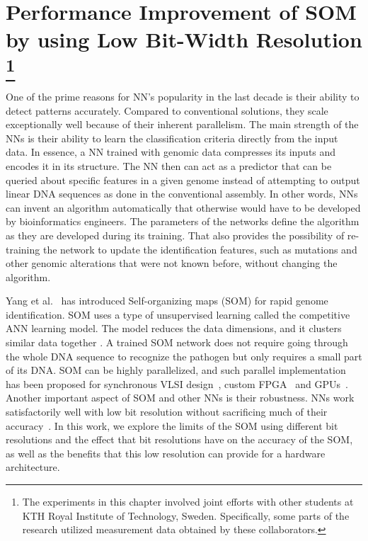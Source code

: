 \graphicspath{{./Ch5-SOM/images/}}

\chapter[Performance Improvement of SOM by using Low Bit-Width Resolution]{Performance Improvement of SOM by using Low Bit-Width Resolution \footnote{The experiments in this chapter involved joint efforts with other students at KTH Royal Institute of Technology, Sweden. Specifically, some parts of the research utilized measurement data obtained by these collaborators.}} 
\label{chap:SOM}
One of the prime reasons for NN's popularity in the last decade is their ability to detect patterns accurately. Compared to conventional solutions, they scale exceptionally well because of their inherent parallelism. The main strength of the NNs is their ability to learn the classification criteria directly from the input data. In essence, a NN trained with genomic data compresses its inputs and encodes it in its structure. The NN then can act as a predictor that can be queried about specific features in a given genome instead of attempting to output linear DNA sequences as done in the conventional assembly. In other words, NNs can invent an algorithm automatically that otherwise would have to be developed by bioinformatics engineers. The parameters of the networks define the algorithm as they are developed during its training. That also provides the possibility of re-training the network to update the identification features, such as mutations and other genomic alterations that were not known before, without changing the algorithm.

Yang et al.~\cite{Yang2018RiBoSOM} has introduced Self-organizing maps (SOM) for rapid genome identification. SOM uses a type of unsupervised learning called the competitive ANN learning model. The model reduces the data dimensions, and it clusters similar data together \cite{Kohonen2013}. A trained SOM network does not require going through the whole DNA sequence to recognize the pathogen but only requires a small part of its DNA. SOM can be highly parallelized, and such parallel implementation has been proposed for synchronous VLSI design~\cite{Yang2018RiBoSOM}, custom FPGA~\cite{Porrmann2006} and GPUs~\cite{McConnell2012}. Another important aspect of SOM and other NNs is their robustness. NNs work satisfactorily well with low bit resolution without sacrificing much of their accuracy~\cite{8056820}. In this work, we explore the limits of the SOM using different bit resolutions and the effect that bit resolutions have on the accuracy of the SOM, as well as the benefits that this low resolution can provide for a hardware architecture. 


